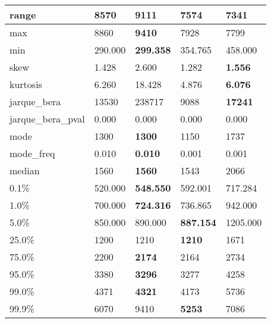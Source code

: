 \begin{table}[H]
\begin{tabular}{|l|m{10em}|m{10em}|m{10em}|m{10em}|}
\hline range & 8570 & \bfseries 9111 & 7574 & \cellcolor[rgb]{0.9, 0.54, 0.52} 7341 \\
\hline max & 8860 & \bfseries 9410 & 7928 & \cellcolor[rgb]{0.9, 0.54, 0.52} 7799 \\
\hline min & 290.000 & \bfseries 299.358 & 354.765 & \cellcolor[rgb]{0.9, 0.54, 0.52} 458.000 \\
\hline skew & 1.428 & \cellcolor[rgb]{0.9, 0.54, 0.52} 2.600 & 1.282 & \bfseries 1.556 \\
\hline kurtosis & 6.260 & \cellcolor[rgb]{0.9, 0.54, 0.52} 18.428 & 4.876 & \bfseries 6.076 \\
\hline jarque\_bera & 13530 & \cellcolor[rgb]{0.9, 0.54, 0.52} 238717 & 9088 & \bfseries 17241 \\
\hline jarque\_bera\_pval & 0.000 & 0.000 & 0.000 & 0.000 \\
\hline mode & 1300 & \bfseries 1300 & 1150 & \cellcolor[rgb]{0.9, 0.54, 0.52} 1737 \\
\hline mode\_freq & 0.010 & \bfseries 0.010 & \cellcolor[rgb]{0.9, 0.54, 0.52} 0.001 & 0.001 \\
\hline median & 1560 & \bfseries 1560 & 1543 & \cellcolor[rgb]{0.9, 0.54, 0.52} 2066 \\
\hline 0.1\% & 520.000 & \bfseries 548.550 & 592.001 & \cellcolor[rgb]{0.9, 0.54, 0.52} 717.284 \\
\hline 1.0\% & 700.000 & \bfseries 724.316 & 736.865 & \cellcolor[rgb]{0.9, 0.54, 0.52} 942.000 \\
\hline 5.0\% & 850.000 & 890.000 & \bfseries 887.154 & \cellcolor[rgb]{0.9, 0.54, 0.52} 1205.000 \\
\hline 25.0\% & 1200 & 1210 & \bfseries 1210 & \cellcolor[rgb]{0.9, 0.54, 0.52} 1671 \\
\hline 75.0\% & 2200 & \bfseries 2174 & 2164 & \cellcolor[rgb]{0.9, 0.54, 0.52} 2734 \\
\hline 95.0\% & 3380 & \bfseries 3296 & 3277 & \cellcolor[rgb]{0.9, 0.54, 0.52} 4258 \\
\hline 99.0\% & 4371 & \bfseries 4321 & 4173 & \cellcolor[rgb]{0.9, 0.54, 0.52} 5736 \\
\hline 99.9\% & 6070 & \cellcolor[rgb]{0.9, 0.54, 0.52} 9410 & \bfseries 5253 & 7086 \\
\hline
\end{tabular}
\end{table}
